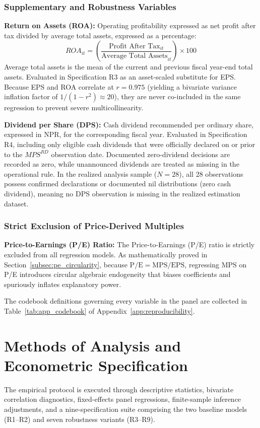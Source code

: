 \subsubsection{Supplementary and Robustness Variables}
\textbf{Return on Assets (ROA):}
Operating profitability expressed as net profit after tax divided by average total assets, expressed as a percentage:
\begin{equation}
\mathit{ROA}_{it} = \left(\frac{\text{Profit After Tax}_{it}}{\text{Average Total Assets}_{it}}\right) \times 100
\label{eq:roa_def}
\end{equation}
Average total assets is the mean of the current and previous fiscal year-end total assets.
Evaluated in Specification R3 as an asset-scaled substitute for EPS. Because EPS and ROA correlate at $r = 0.975$ (yielding a bivariate variance inflation factor of $1 / (1 - r^2) \approx 20$), they are never co-included in the same regression to prevent severe multicollinearity.

\textbf{Dividend per Share (DPS):}
Cash dividend recommended per ordinary share, expressed in NPR, for the corresponding fiscal year. Evaluated in Specification R4, including only eligible cash dividends that were officially declared on or prior to the $\mathit{MPS}^{RD}$ observation date. Documented zero-dividend decisions are recorded as zero, while unannounced dividends are treated as missing in the operational rule. In the realized analysis sample ($N = 28$), all 28 observations possess confirmed declarations or documented nil distributions (zero cash dividend), meaning no DPS observation is missing in the realized estimation dataset.

\subsubsection{Strict Exclusion of Price-Derived Multiples}
\textbf{Price-to-Earnings (P/E) Ratio:}
The Price-to-Earnings (P/E) ratio is strictly excluded from all regression models. As mathematically proved in Section~\ref{subsec:pe_circularity}, because $\text{P/E} = \text{MPS} / \text{EPS}$, regressing MPS on P/E introduces circular algebraic endogeneity that biases coefficients and spuriously inflates explanatory power.

The codebook definitions governing every variable in the panel are collected in Table~\ref{tab:app_codebook} of Appendix~\ref{app:reproducibility}.

\section{Methods of Analysis and Econometric Specification}
The empirical protocol is executed through descriptive statistics, bivariate correlation diagnostics, fixed-effects panel regressions, finite-sample inference adjustments, and a nine-specification suite comprising the two baseline models (R1--R2) and seven robustness variants (R3--R9).

